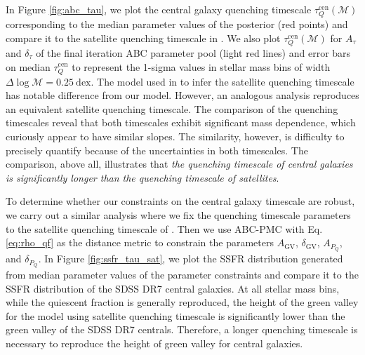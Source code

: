 In Figure \ref{fig:abc_tau}, we plot the central galaxy quenching timescale
$\tau^\mathrm{cen}_Q(\mathcal{M})$ corresponding to the median parameter 
values of the posterior (red points) and compare it to the satellite 
quenching timescale in \cite{Wetzel:2013aa}. We also plot 
$\tau^\mathrm{cen}_Q(\mathcal{M})$ for $A_\tau$ and $\delta_\tau$ of the 
final iteration ABC parameter pool (light red lines) and error bars on
median $\tau^\mathrm{cen}_Q$ to represent the 1-sigma values
in stellar mass bins of width $\Delta \log\mathcal{M} = 0.25~\mathrm{dex}$.
The model used in \cite{Wetzel:2013aa} to infer the satellite 
quenching timescale has notable difference from our model. However, 
an analogous analysis reproduces an equivalent satellite quenching timescale.
The comparison of the quenching timescales reveal that both timescales 
exhibit significant mass dependence, which curiously appear to have 
similar slopes. The similarity, however, is difficulty to precisely 
quantify because of the uncertainties in both timescales.
The comparison, above all, illustrates that {\em the quenching timescale 
of central galaxies is significantly longer than the quenching timescale 
of satellites}. 

To determine whether our constraints on the central galaxy 
timescale are robust, we carry out a similar analysis where
we fix the quenching timescale parameters to the satellite quenching 
timescale of \cite{Wetzel:2013aa}. Then we use ABC-PMC with 
Eq. \ref{eq:rho_qf} as the distance metric to constrain the 
parameters $A_\mathrm{GV}$, $\delta_\mathrm{GV}$, $A_{P_Q}$, 
and $\delta_{P_Q}$. In Figure \ref{fig:ssfr_tau_sat}, we plot 
the SSFR distribution generated from median parameter values 
of the parameter constraints and compare it to the SSFR 
distribution of the SDSS DR7 central galaxies. At all stellar 
mass bins, while the quiescent fraction is generally reproduced, 
the height of the green valley for the model using satellite 
quenching timescale is significantly lower than the green valley 
of the SDSS DR7 centrals. 
Therefore, a longer quenching timescale is necessary to 
reproduce the height of green valley for central galaxies.

